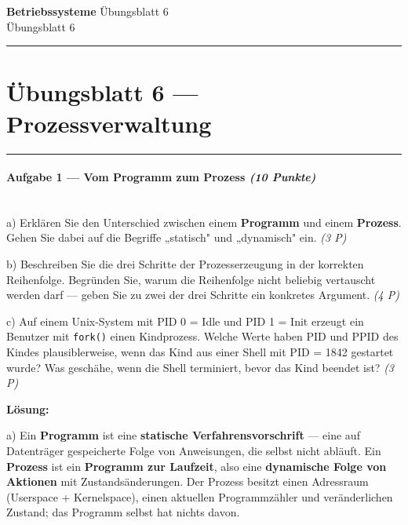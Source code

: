 \documentclass[11pt, a4paper]{article}
\providecommand{\nichttitle}{Übungsblatt}
\providecommand{\nichtsubtitle}{}
\renewcommand{\nichttitle}{Betriebssysteme}
\renewcommand{\nichtsubtitle}{Übungsblatt 6}
\begin{document}
\begin{center}
{\Large\bfseries\color{accent}\nichttitle}
\ifx\nichtsubtitle\empty\else
  \\[2pt]{\normalsize\color{accent!80!black}\nichtsubtitle}
\fi
\\[2pt]
\color{accent}\rule{0.4\linewidth}{0.8pt}\color{black}
\end{center}
\vspace{4pt}


\section{Übungsblatt 6 — Prozessverwaltung}


\noindent\textcolor{rulegray}{\rule{\linewidth}{0.4pt}}


\paragraph{Aufgabe 1 — Vom Programm zum Prozess \textit{(10 Punkte)}}\mbox{}\\[2pt]

a) Erklären Sie den Unterschied zwischen einem \textbf{Programm} und einem \textbf{Prozess}. Gehen Sie dabei auf die Begriffe „statisch" und „dynamisch" ein. \textit{(3 P)}


b) Beschreiben Sie die drei Schritte der Prozesserzeugung in der korrekten Reihenfolge. Begründen Sie, warum die Reihenfolge nicht beliebig vertauscht werden darf — geben Sie zu zwei der drei Schritte ein konkretes Argument. \textit{(4 P)}


c) Auf einem Unix-System mit PID 0 = Idle und PID 1 = Init erzeugt ein Benutzer mit \texttt{fork()} einen Kindprozess. Welche Werte haben PID und PPID des Kindes plausiblerweise, wenn das Kind aus einer Shell mit PID = 1842 gestartet wurde? Was geschähe, wenn die Shell terminiert, bevor das Kind beendet ist? \textit{(3 P)}


\textbf{Lösung:}


a) Ein \textbf{Programm} ist eine \textbf{statische Verfahrensvorschrift} — eine auf Datenträger gespeicherte Folge von Anweisungen, die selbst nicht abläuft. Ein \textbf{Prozess} ist ein \textbf{Programm zur Laufzeit}, also eine \textbf{dynamische Folge von Aktionen} mit Zustandsänderungen. Der Prozess besitzt einen Adressraum (Userspace + Kernelspace), einen aktuellen Programmzähler und veränderlichen Zustand; das Programm selbst hat nichts davon.
\end{document}
